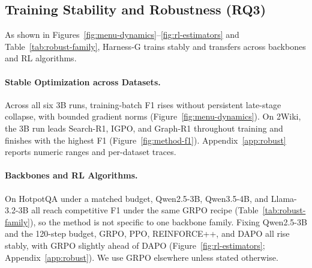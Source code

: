 \documentclass[letterpaper]{article} %
\begin{document}
\subsection{Training Stability and Robustness (RQ3)}

As shown in Figures~\ref{fig:menu-dynamics}--\ref{fig:rl-estimators} and Table~\ref{tab:robust-family}, Harness-G trains stably and transfers across backbones and RL algorithms.

\paragraph{Stable Optimization across Datasets.}
Across all six 3B runs, training-batch F1 rises without persistent late-stage collapse, with bounded gradient norms (Figure~\ref{fig:menu-dynamics}).
On 2Wiki, the 3B run leads Search-R1, IGPO, and Graph-R1 throughout training and finishes with the highest F1 (Figure~\ref{fig:method-f1}).
Appendix~\ref{app:robust} reports numeric ranges and per-dataset traces.

\paragraph{Backbones and RL Algorithms.}
On HotpotQA under a matched budget, Qwen2.5-3B, Qwen3.5-4B, and Llama-3.2-3B all reach competitive F1 under the same GRPO recipe (Table~\ref{tab:robust-family}), so the method is not specific to one backbone family.
Fixing Qwen2.5-3B and the 120-step budget, GRPO, PPO, REINFORCE++, and DAPO \citep{schulman2017ppo,hu2025reinforcepp,shao2024deepseekmath,yu2025dapo} all rise stably, with GRPO slightly ahead of DAPO (Figure~\ref{fig:rl-estimators}; Appendix~\ref{app:robust}).
We use GRPO elsewhere unless stated otherwise.
\end{document}
